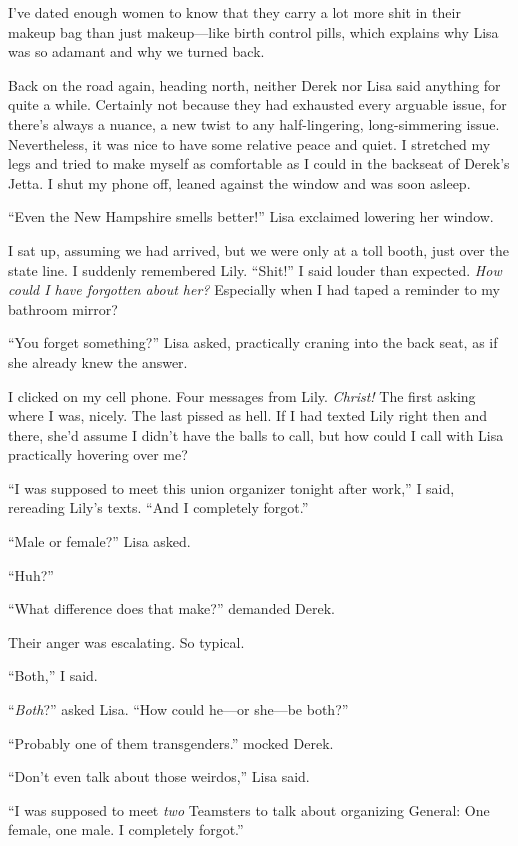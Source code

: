 I've dated enough women to know that they carry a lot more shit in their
makeup bag than just makeup---like birth control pills, which explains
why Lisa was so adamant and why we turned back.

Back on the road again, heading north, neither Derek nor Lisa said
anything for quite a while. Certainly not because they had exhausted
every arguable issue, for there's always a nuance, a new twist to any
half-lingering, long-simmering issue. Nevertheless, it was nice to have
some relative peace and quiet. I stretched my legs and tried to make
myself as comfortable as I could in the backseat of Derek's Jetta. I
shut my phone off, leaned against the window and was soon asleep.

``Even the New Hampshire smells better!'' Lisa exclaimed lowering her
window.

I sat up, assuming we had arrived, but we were only at a toll booth,
just over the state line. I suddenly remembered Lily. ``Shit!'' I said
louder than expected. \emph{How could I have forgotten about her?}
Especially when I had taped a reminder to my bathroom mirror?

``You forget something?'' Lisa asked, practically craning into the back
seat, as if she already knew the answer.

I clicked on my cell phone. Four messages from Lily. \emph{Christ!} The
first asking where I was, nicely. The last pissed as hell. If I had
texted Lily right then and there, she'd assume I didn't have the balls
to call, but how could I call with Lisa practically hovering over me?

``I was supposed to meet this union organizer tonight after work,'' I
said, rereading Lily's texts. ``And I completely forgot.''

``Male or female?'' Lisa asked.

``Huh?''

``What difference does that make?'' demanded Derek.

Their anger was escalating. So typical.

``Both,'' I said.

``\emph{Both}?'' asked Lisa. ``How could he---or she---be both?''

``Probably one of them transgenders.'' mocked Derek.

``Don't even talk about those weirdos,'' Lisa said.

``I was supposed to meet \emph{two} Teamsters to talk about organizing
General: One female, one male. I completely forgot.''

